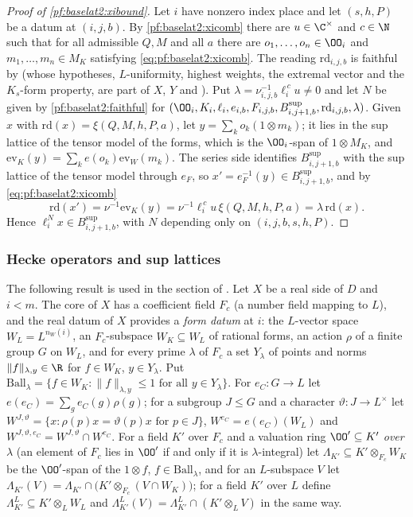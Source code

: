 \begin{proof}[Proof of \cref{pf:baselat2:xibound}]
Let $i$ have nonzero index place and let $(s,h,P)$ be a datum at $(i,j,b)$. By \cref{pf:baselat2:xicomb} there are
$u\in\C^\times$ and $c\in\N$ such that for all admissible $Q,M$ and all $a$ there are $o_1,\dots,o_n\in\OO_i$ and
$m_1,\dots,m_n\in M_K$ satisfying \eqref{eq:pf:baselat2:xicomb}.
The reading $\mathrm{rd}_{i,j,b}$ is faithful by  (whose
hypotheses, $L$-uniformity, highest weights, the extremal vector and the $K_s$-form property, are part of
$X$, $Y$ and ). Put
$\lambda=\nu_{i,j,b}^{-1}\ell_i^{\,c}u\neq0$ and let $N$ be given by \cref{pf:baselat2:faithful} for
$(\OO_i,K_i,\ell_i,e_{i,b},F_{i,j,b},B^{\sup}_{i,j+1,b},\mathrm{rd}_{i,j,b},\lambda)$. Given $x$ with
$\mathrm{rd}(x)=\xi(Q,M,h,P,a)$, let $y=\sum_k o_k(1\otimes m_k)$; it lies in the sup lattice of the tensor model
of the forms, which is the $\OO_i$-span of $1\otimes M_K$, and $\mathrm{ev}_K(y)=\sum_ke(o_k)\mathrm{ev}_W(m_k)$. The series
side identifies $B^{\sup}_{i,j+1,b}$ with the sup lattice of the tensor model through $e_F$, so
$x'=e_F^{-1}(y)\in B^{\sup}_{i,j+1,b}$, and by \eqref{eq:pf:baselat2:xicomb}
\[
  \mathrm{rd}(x')=\nu^{-1}\mathrm{ev}_K(y)=\nu^{-1}\ell_i^{\,c}u\,\xi(Q,M,h,P,a)=\lambda\,\mathrm{rd}(x).
\]
Hence $\ell_i^Nx\in B^{\sup}_{i,j+1,b}$, with $N$ depending only on $(i,j,b,s,h,P)$.
\end{proof}

\subsubsection{Hecke operators and sup lattices}

The following result is used in the section of
. Let $X$ be a real side of $D$ and $i<m$. The
core of $X$ has a coefficient field $F_c$ (a number field mapping to $L$), and the real datum of $X$ provides a
\emph{form datum} at $i$: the $L$-vector space $W_L=L^{n_W(i)}$, an $F_c$-subspace $W_K\subseteq W_L$ of rational forms,
an action $\rho$ of a finite group $G$ on $W_L$, and for every prime $\lambda$ of $F_c$ a set $Y_\lambda$ of points and norms
$\|f\|_{\lambda,y}\in\R$ for $f\in W_K$, $y\in Y_\lambda$. Put $\mathrm{Ball}_\lambda=\{f\in W_K:\|f\|_{\lambda,y}\le1\text{ for all }y\in Y_\lambda\}$.
For $e_C:G\to L$ let $e(e_C)=\sum_ge_C(g)\rho(g)$; for a subgroup $J\le G$ and a character $\vartheta:J\to L^\times$ let
$W^{J,\vartheta}=\{x:\rho(p)x=\vartheta(p)x\text{ for }p\in J\}$, $W^{e_C}=e(e_C)(W_L)$ and $W^{J,\vartheta,e_C}=W^{J,\vartheta}\cap W^{e_C}$.
For a field $K'$ over $F_c$ and a valuation ring $\OO'\subseteq K'$ \emph{over $\lambda$} (an element of $F_c$ lies in $\OO'$ if
and only if it is $\lambda$-integral) let $\Lambda_{K'}\subseteq K'\otimes_{F_c}W_K$ be the $\OO'$-span of the $1\otimes f$,
$f\in\mathrm{Ball}_\lambda$, and for an $L$-subspace $V$ let $\Lambda_{K'}(V)=\Lambda_{K'}\cap\bigl(K'\otimes_{F_c}(V\cap W_K)\bigr)$; for a field
$K'$ over $L$ define $\Lambda^L_{K'}\subseteq K'\otimes_LW_L$ and $\Lambda^L_{K'}(V)=\Lambda^L_{K'}\cap(K'\otimes_LV)$ in the same way.

